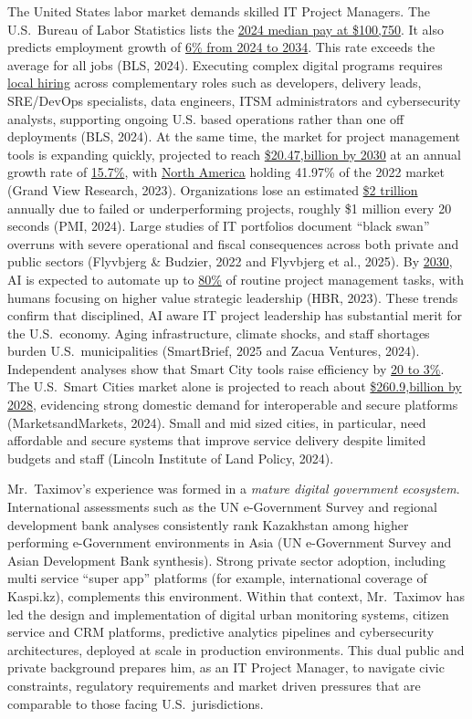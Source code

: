 \label{sec:Benefit}



The United States labor market demands skilled IT Project Managers. The U.S.\ Bureau of Labor Statistics lists the \underline{2024 median pay at \$100,750}. It also predicts employment growth of \underline{6\% from 2024 to 2034}. This rate exceeds the average for all jobs (BLS, 2024). Executing complex digital programs requires \underline{local hiring} across complementary roles such as developers, delivery leads, SRE/DevOps specialists, data engineers, ITSM administrators and cybersecurity analysts, supporting ongoing U.S. based operations rather than one off deployments (BLS, 2024).
At the same time, the market for project management tools is expanding quickly, projected to reach \underline{\$20.47,billion by 2030} at an annual growth rate of \underline{15.7\%}, with \underline{North America} holding 41.97\% of the 2022 market (Grand View Research, 2023). Organizations lose an estimated \underline{\$2 trillion} annually due to failed or underperforming projects, roughly \$1 million every 20 seconds (PMI, 2024). Large studies of IT portfolios document “black swan” overruns with severe operational and fiscal consequences across both private and public sectors (Flyvbjerg \& Budzier, 2022 and Flyvbjerg et al., 2025). By \underline{2030}, AI is expected to automate up to \underline{80\%} of routine project management tasks, with humans focusing on higher value strategic leadership (HBR, 2023). These trends confirm that disciplined, AI aware IT project leadership has substantial merit for the U.S.\ economy.
Aging infrastructure, climate shocks, and staff shortages burden U.S.\ municipalities (SmartBrief, 2025 and Zacua Ventures, 2024). Independent analyses show that Smart City tools raise efficiency by \underline{20 to 3\%}. The U.S.\ Smart Cities market alone is projected to reach about \underline{\$260.9,billion by 2028}, evidencing strong domestic demand for interoperable and secure platforms (MarketsandMarkets, 2024). Small and mid sized cities, in particular, need affordable and secure systems that improve service delivery despite limited budgets and staff (Lincoln Institute of Land Policy, 2024).



Mr.~Taximov’s experience was formed in a \emph{mature digital government ecosystem}. International assessments such as the UN e-Government Survey and regional development bank analyses consistently rank Kazakhstan among higher performing e-Government environments in Asia (UN e-Government Survey and Asian Development Bank synthesis). Strong private sector adoption, including multi service “super app” platforms (for example, international coverage of Kaspi.kz), complements this environment. Within that context, Mr.~Taximov has led the design and implementation of digital urban monitoring systems, citizen service and CRM platforms, predictive analytics pipelines and cybersecurity architectures, deployed at scale in production environments. This dual public and private background prepares him, as an IT Project Manager, to navigate civic constraints, regulatory requirements and market driven pressures that are comparable to those facing U.S.\ jurisdictions.



